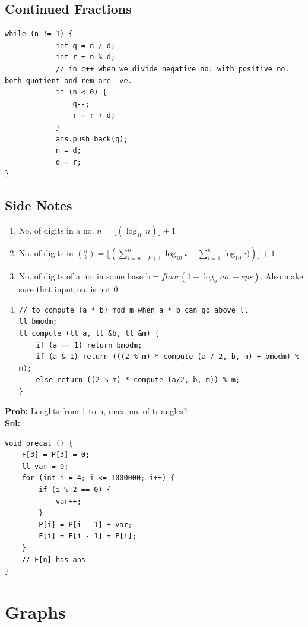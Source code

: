 \documentclass[8pt, a4paper, oneside, twocolumn]{extarticle}
\begin{document}
\subsection{Continued Fractions}
\begin{verbatim}
while (n != 1) {
            int q = n / d;
            int r = n % d;
            // in c++ when we divide negative no. with positive no. both quotient and rem are -ve.
            if (n < 0) {
                q--;
                r = r + d;
            }
            ans.push_back(q);
            n = d;
            d = r;
}
\end{verbatim}
\subsection{Side Notes}
\begin{enumerate}
    \item No. of digits in a no. $n = \lfloor(\log_{10}{n})\rfloor + 1$
    \item No. of digits in $\binom{n}{k} = \lfloor(\sum_{i = n - k + 1}^{n}\log_{10}{i} - \sum_{i = 1}^{k}\log_{10}{i)})\rfloor + 1$
    \item No. of digits of a no. in some base b$ = floor(1 + \log_b{no.} + eps)$. Also make sure that input no. is not 0.
    \item
\begin{verbatim}
// to compute (a * b) mod m when a * b can go above ll
ll bmodm;
ll compute (ll a, ll &b, ll &m) {
    if (a == 1) return bmodm;
    if (a & 1) return (((2 % m) * compute (a / 2, b, m) + bmodm) % m);
    else return ((2 % m) * compute (a/2, b, m)) % m;
}
\end{verbatim}
\end{enumerate}
\textbf{Prob: }Lenghts from 1 to n, max. no. of triangles?
\\\textbf{Sol: }
\begin{verbatim}
void precal () {
    F[3] = P[3] = 0;
    ll var = 0;
    for (int i = 4; i <= 1000000; i++) {
        if (i % 2 == 0) {
            var++;
        }
        P[i] = P[i - 1] + var;
        F[i] = F[i - 1] + P[i];
    }
    // F[n] has ans
}
            \end{verbatim}
\section{Graphs}
\end{document}

